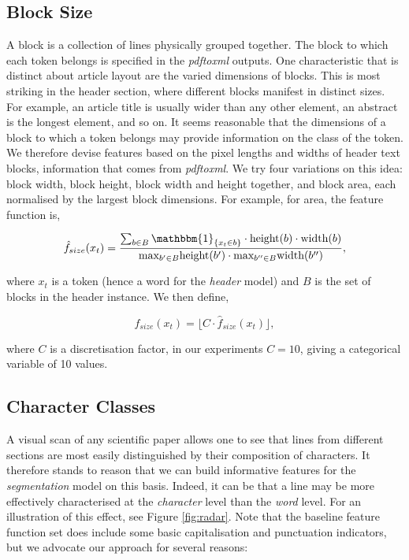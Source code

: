\subsection{Block Size}

A block is a collection of lines physically grouped together. The block to which each token belongs is specified in the \emph{pdftoxml} outputs. One characteristic that is distinct about article layout are the varied dimensions of blocks. This is most striking in the header section, where different blocks manifest in distinct sizes. For example, an article title is usually wider than any other element, an abstract is the longest element, and so on. It seems reasonable that the dimensions of a block to which a token belongs may provide information on the class of the token. We therefore devise features based on the pixel lengths and widths of header text blocks, information that comes from \emph{pdftoxml}. We try four variations on this idea: block width, block height, block width and height together, and block area, each normalised by the largest block dimensions. For example, for area, the feature function is,

\begin{equation}
\hat f_{size}(x_t) = \frac{\sum_{b \in B} \mathbbm{1}_{\{x_t \in b\}} \cdot\text{height}(b)\cdot\text{width}(b)}{\text{max}_{b' \in B} \text{height}(b') \cdot \text{max}_{b'' \in B} \text{width}(b'')},
\label{eq:areafunction}
\end{equation}

where $x_t$ is a token (hence a word for the \emph{header} model) and $B$ is the set of blocks in the header instance. We then define,

\begin{equation}
f_{size}(x_t) = \big\lfloor C \cdot\hat f_{size}(x_t)\big\rfloor,
\label{eq:areafunctiondisc}
\end{equation}

where $C$ is a discretisation factor, in our experiments $C = 10$, giving a categorical variable of 10 values.

\subsection{Character Classes}
\label{subsec:characterclasses}
A visual scan of any scientific paper allows one to see that lines from different sections are most easily distinguished by their composition of characters. It therefore stands to reason that we can build informative features for the \emph{segmentation} model on this basis. Indeed, it can be that a line may be more effectively characterised at the \emph{character} level than the \emph{word} level. For an illustration of this effect, see Figure \ref{fig:radar}. Note that the baseline feature function set does include some basic capitalisation and punctuation indicators, but we advocate our approach for several reasons:

